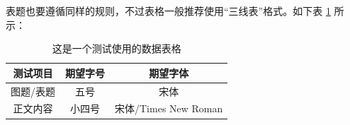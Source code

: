 表题也要遵循同样的规则，不过表格一般推荐使用“三线表”格式。如下表 \ref{tab:test} 所示：

\begin{table}[H]
  \centering
  \caption{这是一个测试使用的数据表格}
  \label{tab:test}
  \begin{tabular}{ccc}
    \toprule
    测试项目 & 期望字号 & 期望字体 \\
    \midrule
    图题/表题 & 五号 & 宋体 \\
    正文内容 & 小四号 & 宋体/Times New Roman \\
    \bottomrule
  \end{tabular}
\end{table}
